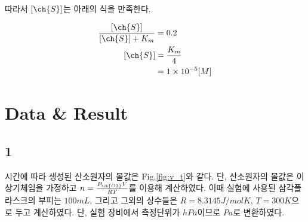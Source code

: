 \documentclass[%
 reprint,
 amsmath,amssymb,
 aps,
]{revtex4-2}
\begin{document}
따라서 $[\ch{S}]$는 아래의 식을 만족한다.

\begin{align}
	\frac{[\ch{S}]}{[\ch{S}] + K_{m}} &= 0.2\\
	[\ch{S}] &= \frac{K_{m}}{4}\\
	&= 1\times 10^{-5} [M]
\end{align}

\section{\label{sec:level1}Data \& Result}
\subsection{\label{sec:level2} 1}
시간에 따라 생성된 산소원자의 몰값은 Fig.\ref{fig:v_t}와 같다. 단, 산소원자의 몰값은 이상기체임을 가정하고 $n=\frac{P_{\ch{O2}}V}{RT}$를 이용해 계산하였다. 이때 실험에 사용된 삼각플라스크의 부피는 $100mL$, 그리고 그외의 상수들은 $R=8.3145J/mol K$, $T=300K$으로 두고 계산하였다. 단, 실험 장비에서 측정단위가 $hPa$이므로 $Pa$로 변환하였다.
\end{document}
